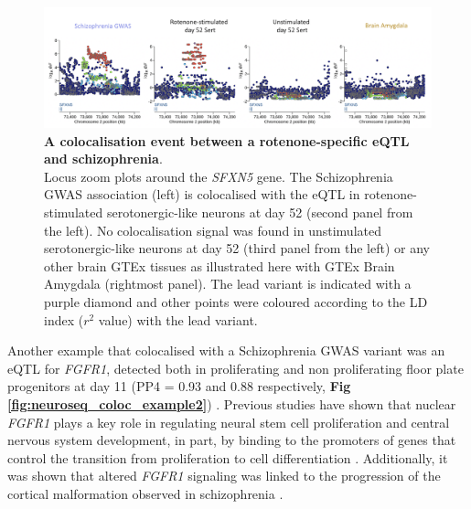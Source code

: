 \begin{figure}[h]
\centering
\includegraphics[width=15.5cm]{Chapter5/Fig/neuroseq_coloc_example1_SFXN5.png}
\caption[First example of colocalisation]{\textbf{A colocalisation event between a rotenone-specific eQTL and schizophrenia}.\\
Locus zoom plots around the \textit{SFXN5} gene. 
The Schizophrenia GWAS association (left) is colocalised with the eQTL in rotenone-stimulated serotonergic-like neurons at day 52 (second panel from the left). 
No colocalisation signal was found in unstimulated serotonergic-like neurons at day 52 (third panel from the left) or any other brain GTEx tissues as illustrated here with GTEx Brain Amygdala (rightmost panel). 
The lead variant is indicated with a purple diamond and other points were coloured according to the LD index ($r^2$ value) with the lead variant.}
\label{fig:neuroseq_coloc_example1}
\end{figure}

Another example that colocalised with a Schizophrenia GWAS variant was an eQTL for
\textit{FGFR1}, detected both in proliferating and non proliferating floor plate progenitors at day 11 (PP4 = 0.93 and 0.88 respectively, \textbf{Fig \ref{fig:neuroseq_coloc_example2}}) . 
Previous studies have shown that nuclear \textit{FGFR1} plays a key role in regulating neural stem cell proliferation and central nervous system development, in part, by binding to the promoters of genes that control the transition from proliferation to cell differentiation \cite{ma2009molecular}. 
Additionally, it was shown that altered \textit{FGFR1} signaling was linked to the progression of the cortical malformation observed in schizophrenia \cite{stachowiak2017cerebral}.\\

